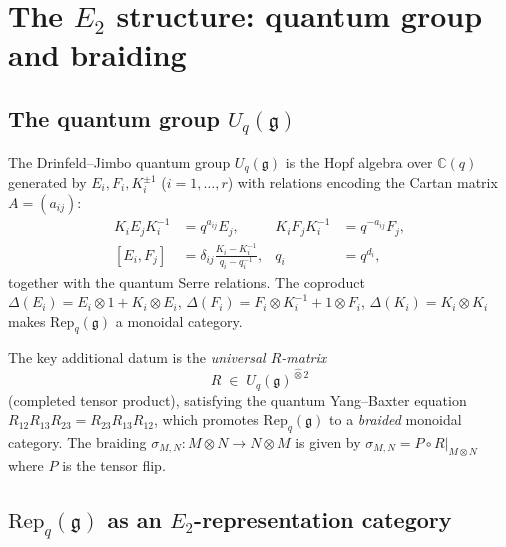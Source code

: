 \documentclass[11pt]{article}
\theoremstyle{definition}
\theoremstyle{remark}
\newcommand{\Rep}{\mathrm{Rep}}
\newcommand{\Uq}{U_q}
\newcommand{\frakg}{\mathfrak{g}}
\begin{document}
\section{The $E_2$ structure: quantum group and braiding}
\label{sec:e2-quantum-group}

\subsection{The quantum group $\Uq(\frakg)$}
\label{subsec:uq}

The Drinfeld--Jimbo quantum group $\Uq(\frakg)$ is the Hopf algebra over
$\mathbb{C}(q)$ generated by $E_i, F_i, K_i^{\pm 1}$ ($i = 1, \ldots, r$)
with relations encoding the Cartan matrix $A = (a_{ij})$:
\begin{align}
 K_i E_j K_i^{-1} &= q^{a_{ij}} E_j, &
 K_i F_j K_i^{-1} &= q^{-a_{ij}} F_j, \\
 [E_i, F_j] &= \delta_{ij} \frac{K_i - K_i^{-1}}{q_i - q_i^{-1}}, &
 q_i &= q^{d_i},
\end{align}
together with the quantum Serre relations. The coproduct
$\Delta(E_i) = E_i \otimes 1 + K_i \otimes E_i$,
$\Delta(F_i) = F_i \otimes K_i^{-1} + 1 \otimes F_i$,
$\Delta(K_i) = K_i \otimes K_i$
makes $\Rep_q(\frakg)$ a monoidal category.

The key additional datum is the \emph{universal $R$-matrix}
\[
 R \;\in\; \Uq(\frakg)^{\hat{\otimes} 2}
\]
(completed tensor product), satisfying the quantum Yang--Baxter equation
$R_{12} R_{13} R_{23} = R_{23} R_{13} R_{12}$,
which promotes $\Rep_q(\frakg)$ to a \emph{braided} monoidal category.
The braiding $\sigma_{M,N} \colon M \otimes N \to N \otimes M$ is
given by $\sigma_{M,N} = P \circ R|_{M \otimes N}$ where $P$ is the
tensor flip.

\subsection{$\Rep_q(\frakg)$ as an $E_2$-representation category}
\label{subsec:rep-q-e2}
\end{document}
